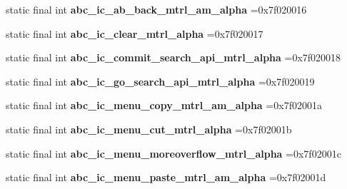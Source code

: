 \begin{DoxyCompactItemize}
\item 
\hypertarget{classcheck_1_1test_1_1_r_1_1drawable_acea61c924c85e1b3700d63588e5e28ed}{}static final int {\bfseries abc\+\_\+ic\+\_\+ab\+\_\+back\+\_\+mtrl\+\_\+am\+\_\+alpha} =0x7f020016\label{classcheck_1_1test_1_1_r_1_1drawable_acea61c924c85e1b3700d63588e5e28ed}

\item 
\hypertarget{classcheck_1_1test_1_1_r_1_1drawable_a6a9efd4231259c8179c9ca326d824e0d}{}static final int {\bfseries abc\+\_\+ic\+\_\+clear\+\_\+mtrl\+\_\+alpha} =0x7f020017\label{classcheck_1_1test_1_1_r_1_1drawable_a6a9efd4231259c8179c9ca326d824e0d}

\item 
\hypertarget{classcheck_1_1test_1_1_r_1_1drawable_a971617e48239a1242fa2c11059ca19fe}{}static final int {\bfseries abc\+\_\+ic\+\_\+commit\+\_\+search\+\_\+api\+\_\+mtrl\+\_\+alpha} =0x7f020018\label{classcheck_1_1test_1_1_r_1_1drawable_a971617e48239a1242fa2c11059ca19fe}

\item 
\hypertarget{classcheck_1_1test_1_1_r_1_1drawable_a4043559802a97e1d096b686e612e654e}{}static final int {\bfseries abc\+\_\+ic\+\_\+go\+\_\+search\+\_\+api\+\_\+mtrl\+\_\+alpha} =0x7f020019\label{classcheck_1_1test_1_1_r_1_1drawable_a4043559802a97e1d096b686e612e654e}

\item 
\hypertarget{classcheck_1_1test_1_1_r_1_1drawable_ab7d6bfe3fd9cc7cbf30b70980074406f}{}static final int {\bfseries abc\+\_\+ic\+\_\+menu\+\_\+copy\+\_\+mtrl\+\_\+am\+\_\+alpha} =0x7f02001a\label{classcheck_1_1test_1_1_r_1_1drawable_ab7d6bfe3fd9cc7cbf30b70980074406f}

\item 
\hypertarget{classcheck_1_1test_1_1_r_1_1drawable_a7aed2ee0ca70509b50665611014fd5f9}{}static final int {\bfseries abc\+\_\+ic\+\_\+menu\+\_\+cut\+\_\+mtrl\+\_\+alpha} =0x7f02001b\label{classcheck_1_1test_1_1_r_1_1drawable_a7aed2ee0ca70509b50665611014fd5f9}

\item 
\hypertarget{classcheck_1_1test_1_1_r_1_1drawable_adf5b4ce4b791fc43b6103f75d3c33768}{}static final int {\bfseries abc\+\_\+ic\+\_\+menu\+\_\+moreoverflow\+\_\+mtrl\+\_\+alpha} =0x7f02001c\label{classcheck_1_1test_1_1_r_1_1drawable_adf5b4ce4b791fc43b6103f75d3c33768}

\item 
\hypertarget{classcheck_1_1test_1_1_r_1_1drawable_a58fcd4d924a2aa062927fe20a3827137}{}static final int {\bfseries abc\+\_\+ic\+\_\+menu\+\_\+paste\+\_\+mtrl\+\_\+am\+\_\+alpha} =0x7f02001d\label{classcheck_1_1test_1_1_r_1_1drawable_a58fcd4d924a2aa062927fe20a3827137}


\end{DoxyCompactItemize}
